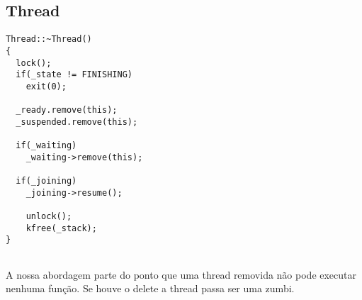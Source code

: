 \documentclass[12pt]{relatorio}
\begin{document}
\newpage

\subsection{Thread}

\begin{lstlisting}
Thread::~Thread()
{
  lock();
  if(_state != FINISHING)
    exit(0);

  _ready.remove(this);
  _suspended.remove(this);

  if(_waiting)
    _waiting->remove(this);

  if(_joining)
    _joining->resume();

    unlock();
    kfree(_stack);
}


\end{lstlisting}
A nossa abordagem parte do ponto que uma thread removida não pode executar nenhuma função. Se houve o delete a thread passa ser uma zumbi.
\end{document}

